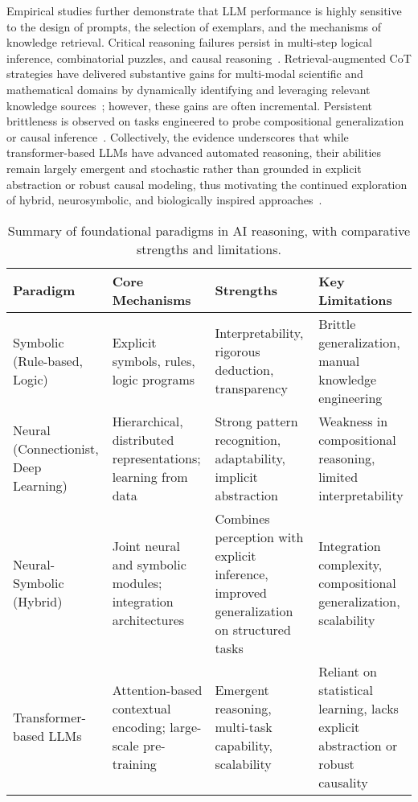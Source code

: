 Empirical studies further demonstrate that LLM performance is highly sensitive to the design of prompts, the selection of exemplars, and the mechanisms of knowledge retrieval. Critical reasoning failures persist in multi-step logical inference, combinatorial puzzles, and causal reasoning~\cite{ref1,ref10,ref19}. Retrieval-augmented CoT strategies have delivered substantive gains for multi-modal scientific and mathematical domains by dynamically identifying and leveraging relevant knowledge sources~\cite{ref11,ref42}; however, these gains are often incremental. Persistent brittleness is observed on tasks engineered to probe compositional generalization or causal inference~\cite{ref43,ref44,ref70,ref86}. Collectively, the evidence underscores that while transformer-based LLMs have advanced automated reasoning, their abilities remain largely emergent and stochastic rather than grounded in explicit abstraction or robust causal modeling, thus motivating the continued exploration of hybrid, neurosymbolic, and biologically inspired approaches~\cite{ref42,ref49,ref86}.

\begin{table*}[htbp]
\centering
\caption{Summary of foundational paradigms in AI reasoning, with comparative strengths and limitations.}
\label{tab:paradigm_comparison}
\begin{adjustbox}{max width=\textwidth}
\begin{tabular}{llll}
\toprule
\textbf{Paradigm} & \textbf{Core Mechanisms} & \textbf{Strengths} & \textbf{Key Limitations} \\
\midrule
Symbolic (Rule-based, Logic) & Explicit symbols, rules, logic programs & Interpretability, rigorous deduction, transparency & Brittle generalization, manual knowledge engineering \\
Neural (Connectionist, Deep Learning) & Hierarchical, distributed representations; learning from data & Strong pattern recognition, adaptability, implicit abstraction & Weakness in compositional reasoning, limited interpretability \\
Neural-Symbolic (Hybrid) & Joint neural and symbolic modules; integration architectures & Combines perception with explicit inference, improved generalization on structured tasks & Integration complexity, compositional generalization, scalability \\
Transformer-based LLMs & Attention-based contextual encoding; large-scale pre-training & Emergent reasoning, multi-task capability, scalability & Reliant on statistical learning, lacks explicit abstraction or robust causality \\
\bottomrule
\end{tabular}
\end{adjustbox}
\end{table*}


